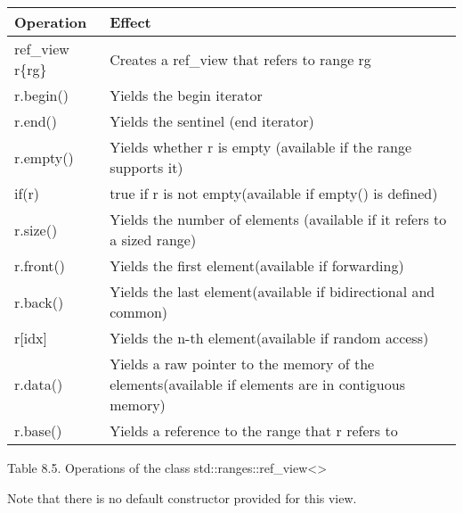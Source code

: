 \begin{longtable}[c]{|l|l|}
\hline
\textbf{Operation} & \textbf{Effect}                                                \\ \hline
\endfirsthead
%
\endhead
%
ref\_view r\{rg\}  & Creates a ref\_view that refers to range rg                    \\ \hline
r.begin()          & Yields the begin iterator                                      \\ \hline
r.end()            & Yields the sentinel (end iterator)                             \\ \hline
r.empty()          & Yields whether r is empty (available if the range supports it) \\ \hline
if(r)              & true if r is not empty(available if empty() is defined)        \\ \hline
r.size() & Yields the number of elements (available if it refers to a sized range)                            \\ \hline
r.front()          & Yields the first element(available if forwarding)              \\ \hline
r.back()           & Yields the last element(available if bidirectional and common) \\ \hline
r{[}idx{]}         & Yields the n-th element(available if random access)            \\ \hline
r.data() & Yields a raw pointer to the memory of the elements(available if elements are in contiguous memory) \\ \hline
r.base()           & Yields a reference to the range that r refers to               \\ \hline
\end{longtable}

\begin{center}
Table 8.5. Operations of the class std::ranges::ref\_view<>
\end{center}

Note that there is no default constructor provided for this view.


